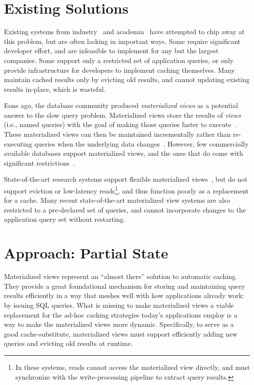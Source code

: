 \section{Existing Solutions}

Existing systems from industry~\cite{facebook-memcache, tao, flannel} and
academia~\cite{txcache, cachegenie, casql-consistency-thesis, pequod} have
attempted to chip away at this problem, but are often lacking in important ways.
Some require significant developer effort, and are infeasible to implement for
any but the largest companies. Some support only a restricted set of application
queries, or only provide infrastructure for developers to implement caching
themselves. Many maintain cached results only by evicting old results, and
cannot updating existing results in-place, which is wasteful.


Eons ago, the database community produced \textit{materialized views} as a
potential answer to the slow query problem. Materialized views store the results
of \textit{views} (i.e., named queries) with the goal of making those queries
faster to execute~\cite{materialized-views}. These materialized views can then
be maintained incrementally rather than re-executing queries when the underlying
data changes~\cite{materialized-survey}. However, few commercially available
databases support materialized views, and the ones that do come with significant
restrictions~\cite{mssql-materialized-view-restrictions}.

State-of-the-art research systems support flexible materialized
views~\cite{dbtoaster,materialize}, but do not support eviction or low-latency
reads\footnote{In these systems, reads cannot access the materialized view
directly, and must synchronize with the write-processing pipeline to extract
query results.}, and thus function poorly as a replacement for a cache. Many
recent state-of-the-art materialized view systems are also restricted to a
pre-declared set of queries, and cannot incorporate changes to the application
query set without restarting.

\section{Approach: Partial State}

Materialized views represent an ``almost there'' solution to automatic caching.
They provide a great foundational mechanism for storing and maintaining query
results efficiently in a way that meshes well with how applications already
work: by issuing SQL queries. What is missing to make materialized views a
viable replacement for the ad-hoc caching strategies today's applications employ
is a way to make the materialized views more dynamic. Specifically, to serve as
a good cache-substitute, materialized views must support efficiently adding new
queries and evicting old results at runtime.

